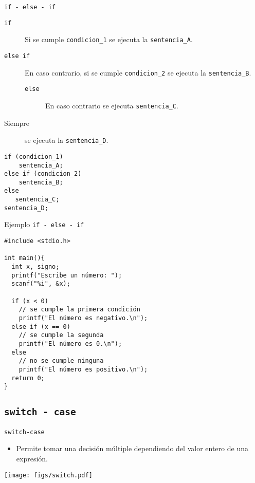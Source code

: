 \documentclass[xcolor={usenames,svgnames,dvipsnames}, aspectratio=169]{beamer}
\begin{document}
\begin{frame}[label={sec:orgb349ca2},fragile]{\texttt{if - else - if}}
 \begin{description}
\item[{\texttt{if}}] Si se cumple \texttt{condicion\_1} se ejecuta la \texttt{sentencia\_A}.
\item[{\texttt{else if}}] En caso contrario, si se cumple \texttt{condicion\_2} se ejecuta la \texttt{sentencia\_B}.
\begin{description}
\item[{\texttt{else}}] En caso contrario se ejecuta \texttt{sentencia\_C}.
\end{description}
\item[{Siempre}] se ejecuta la \texttt{sentencia\_D}.
\end{description}
\lstset{language=C,label= ,caption= ,captionpos=b,numbers=none}
\begin{lstlisting}
if (condicion_1)
    sentencia_A;
else if (condicion_2)
    sentencia_B;
else
   sentencia_C;
sentencia_D;
\end{lstlisting}
\end{frame}

\begin{frame}[label={sec:org795babe},fragile,plain]{Ejemplo \texttt{if - else - if}}
 \lstset{language=C,label= ,caption= ,captionpos=b,numbers=none}
\begin{lstlisting}
#include <stdio.h>

int main(){
  int x, signo;
  printf("Escribe un número: ");
  scanf("%i", &x);

  if (x < 0) 
    // se cumple la primera condición
    printf("El número es negativo.\n");
  else if (x == 0)
    // se cumple la segunda
    printf("El número es 0.\n");
  else
    // no se cumple ninguna
    printf("El número es positivo.\n");
  return 0;
}
\end{lstlisting}
\end{frame}

\subsection{\texttt{switch - case}}
\label{sec:orgf1452af}

\begin{frame}[label={sec:org0883312},fragile]{\texttt{switch-case}}
 \begin{itemize}
\item Permite tomar una decisión múltiple dependiendo del valor \alert{entero} de una expresión.
\end{itemize}

\begin{center}
\texttt{[image: figs/switch.pdf]}
\end{center}
\end{frame}
\end{document}
